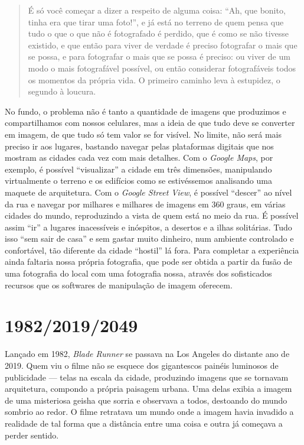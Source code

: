 \begin{quote}
É só você começar a dizer a respeito de alguma coisa: ``Ah, que bonito,
tinha era que tirar uma foto!'', e já está no terreno de quem pensa que
tudo o que o que não é fotografado é perdido, que é como se não tivesse
existido, e que então para viver de verdade é preciso fotografar o mais
que se possa, e para fotografar o mais que se possa é preciso: ou viver
de um modo o mais fotografável possível, ou então considerar
fotografáveis todos os momentos da própria vida. O primeiro caminho leva
à estupidez, o segundo à loucura.
\end{quote}

No fundo, o problema não é tanto a quantidade de imagens que produzimos e compartilhamos com nossos celulares, mas a ideia de que tudo deve se converter em imagem, de que tudo só tem valor se for visível. No limite, não será mais preciso ir aos lugares, bastando navegar pelas
plataformas digitais que nos mostram as cidades cada vez com mais
detalhes. Com o \emph{Google Maps}, por exemplo, é possível
``visualizar'' a cidade em três dimensões, manipulando virtualmente o
terreno e os edifícios como se estivéssemos analisando uma maquete de
arquitetura. Com o \emph{Google Street View}, é possível ``descer'' ao
nível da rua e navegar por milhares e milhares de imagens em 360 graus,
em várias cidades do mundo, reproduzindo a vista de quem está no meio da
rua. É possível assim ``ir'' a lugares inacessíveis e inóspitos, a
desertos e a ilhas solitárias. Tudo isso ``sem sair de casa'' e sem
gastar muito dinheiro, num ambiente controlado e confortável, tão
diferente da cidade ``hostil'' lá fora. Para completar a experiência
ainda faltaria nossa própria fotografia, que pode ser obtida a partir da
fusão de uma fotografia do local com uma fotografia nossa, através dos
sofisticados recursos que os softwares de manipulação de imagem
oferecem.

\chapter{1982/2019/2049}

Lançado em 1982, \emph{Blade Runner} se passava na Los Angeles do
distante ano de 2019. Quem viu o filme não se esquece dos gigantescos
painéis luminosos de publicidade --- telas na escala da cidade,
produzindo imagens que se tornavam arquitetura, compondo a própria
paisagem urbana. Uma delas exibia a imagem de uma misteriosa geisha que
sorria e observava a todos, destoando do mundo sombrio ao redor. O filme
retratava um mundo onde a imagem havia invadido a realidade de tal
forma que a distância entre uma coisa e outra já começava a perder
sentido.

